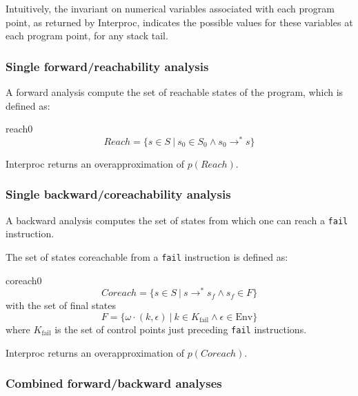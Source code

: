 \documentclass[a4paper,11pt]{article}
\begin{document}
Intuitively, the invariant on numerical variables associated with
each program point, as returned by Interproc, indicates the
possible values for these variables at each program point, for any
stack tail.

\subsubsection*{Single forward/reachability analysis}

A forward analysis compute the set of reachable states of the program, which is defined as:
\htmlonly{\begin{quote}}\begin{image}{reach0}
  $$
Reach = \{ s\in S ~|~ s_0\in S_0 \wedge s_0\rightarrow^* s \}
  $$
\end{image}\htmlonly{\end{quote}}
Interproc returns an overapproximation of $p(Reach)$.

\subsubsection*{Single backward/coreachability analysis}

A backward analysis computes the set of states from which one
can reach a \texttt{fail} instruction.

The set of states coreachable from a \texttt{fail} instruction is
defined as:
\htmlonly{\begin{quote}}\begin{image}{coreach0}
$$
Coreach = \{ s\in S ~|~ s\rightarrow^* s_f \wedge s_f\in F \}
$$
with the set of final states
$$
F = \{ \omega\cdot (k,\epsilon) ~|~ k\in K_\mathrm{fail} \wedge \epsilon\in\mathrm{Env} \}
$$
where $K_\mathrm{fail}$ is the set of control points just
preceding \texttt{fail} instructions.
\end{image}\htmlonly{\end{quote}}
Interproc returns an overapproximation of $p(Coreach)$.

\subsubsection*{Combined forward/backward analyses}
\end{document}
